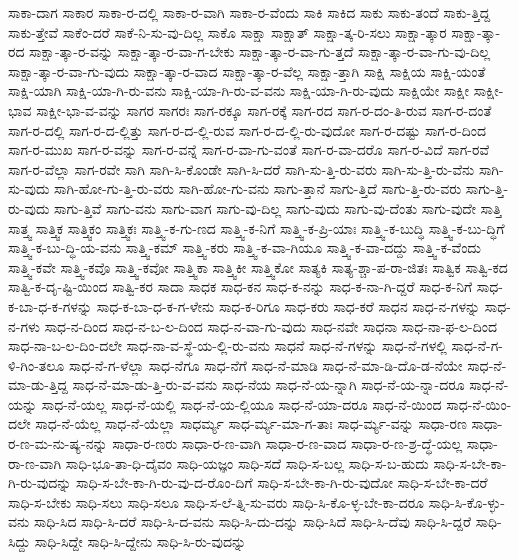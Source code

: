 {ಸಾಕಾ-ದಾಗ
ಸಾಕಾರ
ಸಾಕಾ-ರ-ದಲ್ಲಿ
ಸಾಕಾ-ರ-ವಾಗಿ
ಸಾಕಾ-ರ-ವೆಂದು
ಸಾಕಿ
ಸಾಕಿದ
ಸಾಕು
ಸಾಕು-ತಂದೆ
ಸಾಕು-ತ್ತಿದ್ದ
ಸಾಕು-ತ್ತೇವೆ
ಸಾಕೆಂ-ದರೆ
ಸಾಕೆ-ನಿ-ಸು-ವು-ದಿಲ್ಲ
ಸಾಕೊ
ಸಾಕ್ಷಾ
ಸಾಕ್ಷಾತ್
ಸಾಕ್ಷಾ-ತ್ಕ-ರಿ-ಸಲು
ಸಾಕ್ಷಾ-ತ್ಕಾರ
ಸಾಕ್ಷಾ-ತ್ಕಾ-ರದ
ಸಾಕ್ಷಾ-ತ್ಕಾ-ರ-ವನ್ನು
ಸಾಕ್ಷಾ-ತ್ಕಾ-ರ-ವಾ-ಗ-ಬೇಕು
ಸಾಕ್ಷಾ-ತ್ಕಾ-ರ-ವಾ-ಗು-ತ್ತದೆ
ಸಾಕ್ಷಾ-ತ್ಕಾ-ರ-ವಾ-ಗು-ವು-ದಿಲ್ಲ
ಸಾಕ್ಷಾ-ತ್ಕಾ-ರ-ವಾ-ಗು-ವುದು
ಸಾಕ್ಷಾ-ತ್ಕಾ-ರ-ವಾದ
ಸಾಕ್ಷಾ-ತ್ಕಾ-ರ-ವೆಲ್ಲ
ಸಾಕ್ಷಾ-ತ್ತಾಗಿ
ಸಾಕ್ಷಿ
ಸಾಕ್ಷಿಯ
ಸಾಕ್ಷಿ-ಯಂತೆ
ಸಾಕ್ಷಿ-ಯಾಗಿ
ಸಾಕ್ಷಿ-ಯಾ-ಗಿ-ರು-ವನು
ಸಾಕ್ಷಿ-ಯಾ-ಗಿ-ರು-ವ-ವನು
ಸಾಕ್ಷಿ-ಯಾ-ಗಿ-ರು-ವುದು
ಸಾಕ್ಷಿಯೇ
ಸಾಕ್ಷೀ
ಸಾಕ್ಷೀ-ಭಾವ
ಸಾಕ್ಷೀ-ಭಾ-ವ-ವನ್ನು
ಸಾಗರ
ಸಾಗರಃ
ಸಾಗ-ರಕ್ಕೂ
ಸಾಗ-ರಕ್ಕೆ
ಸಾಗ-ರದ
ಸಾಗ-ರ-ದಂ-ತಿ-ರುವ
ಸಾಗ-ರ-ದಂತೆ
ಸಾಗ-ರ-ದಲ್ಲಿ
ಸಾಗ-ರ-ದ-ಲ್ಲಿತ್ತು
ಸಾಗ-ರ-ದ-ಲ್ಲಿ-ರುವ
ಸಾಗ-ರ-ದ-ಲ್ಲಿ-ರು-ವುದೋ
ಸಾಗ-ರ-ದಷ್ಟು
ಸಾಗ-ರ-ದಿಂದ
ಸಾಗ-ರ-ಮುಖ
ಸಾಗ-ರ-ವನ್ನು
ಸಾಗ-ರ-ವನ್ನೆ
ಸಾಗ-ರ-ವಾ-ಗು-ವಂತೆ
ಸಾಗ-ರ-ವಾ-ದರೊ
ಸಾಗ-ರ-ವಿದೆ
ಸಾಗ-ರವೆ
ಸಾಗ-ರ-ವೆಲ್ಲಾ
ಸಾಗ-ರವೇ
ಸಾಗಿ
ಸಾಗಿ-ಸಿ-ಕೊಂಡೇ
ಸಾಗಿ-ಸಿ-ದರೆ
ಸಾಗಿ-ಸು-ತ್ತಿ-ರು-ವರು
ಸಾಗಿ-ಸು-ತ್ತಿ-ರು-ವೆನು
ಸಾಗಿ-ಸು-ವುದು
ಸಾಗಿ-ಹೋ-ಗು-ತ್ತಿ-ರು-ವರು
ಸಾಗಿ-ಹೋ-ಗು-ವನು
ಸಾಗು-ತ್ತಾನೆ
ಸಾಗು-ತ್ತಿದೆ
ಸಾಗು-ತ್ತಿ-ರು-ವರು
ಸಾಗು-ತ್ತಿ-ರು-ವುದು
ಸಾಗು-ತ್ತಿವೆ
ಸಾಗು-ವನು
ಸಾಗು-ವಾಗ
ಸಾಗು-ವು-ದಿಲ್ಲ
ಸಾಗು-ವುದು
ಸಾಗು-ವು-ದೆಂತು
ಸಾಗು-ವುದೇ
ಸಾತ್ತಿ
ಸಾತ್ತ್ವ
ಸಾತ್ತ್ವಿಕ
ಸಾತ್ತ್ವಿಕಂ
ಸಾತ್ತ್ವಿಕಃ
ಸಾತ್ತ್ವಿ-ಕ-ಗು-ಣದ
ಸಾತ್ತ್ವಿ-ಕ-ನಿಗೆ
ಸಾತ್ತ್ವಿ-ಕ-ಪ್ರಿ-ಯಾಃ
ಸಾತ್ತ್ವಿ-ಕ-ಬುದ್ಧಿ
ಸಾತ್ತ್ವಿ-ಕ-ಬು-ದ್ಧಿಗೆ
ಸಾತ್ತ್ವಿ-ಕ-ಬು-ದ್ಧಿ-ಯ-ವನು
ಸಾತ್ತ್ವಿ-ಕಮ್
ಸಾತ್ತ್ವಿ-ಕರು
ಸಾತ್ತ್ವಿ-ಕ-ವಾ-ಗಿಯೂ
ಸಾತ್ತ್ವಿ-ಕ-ವಾ-ದದ್ದು
ಸಾತ್ತ್ವಿ-ಕ-ವೆಂದು
ಸಾತ್ತ್ವಿ-ಕವೇ
ಸಾತ್ತ್ವಿ-ಕವೊ
ಸಾತ್ತ್ವಿ-ಕವೋ
ಸಾತ್ತ್ವಿಕಾ
ಸಾತ್ತ್ವಿಕೀ
ಸಾತ್ತ್ವಿಕೋ
ಸಾತ್ಯಕಿ
ಸಾತ್ಯ-ಶ್ಚಾ-ಪ-ರಾ-ಜಿತಃ
ಸಾತ್ವಿಕ
ಸಾತ್ವಿ-ಕದ
ಸಾತ್ವಿ-ಕ-ದೃ-ಷ್ಟಿ-ಯಿಂದ
ಸಾತ್ವಿ-ಕರ
ಸಾದಾ
ಸಾಧಕ
ಸಾಧ-ಕನ
ಸಾಧ-ಕ-ನನ್ನು
ಸಾಧ-ಕ-ನಾ-ಗಿ-ದ್ದರೆ
ಸಾಧ-ಕ-ನಿಗೆ
ಸಾಧ-ಕ-ಬಾ-ಧ-ಕ-ಗಳನ್ನು
ಸಾಧ-ಕ-ಬಾ-ಧ-ಕ-ಗ-ಳೇನು
ಸಾಧ-ಕ-ರಿಗೂ
ಸಾಧ-ಕರು
ಸಾಧ-ಕರೆ
ಸಾಧನ
ಸಾಧ-ನ-ಗಳನ್ನು
ಸಾಧ-ನ-ಗಳು
ಸಾಧ-ನ-ದಿಂದ
ಸಾಧ-ನ-ಬ-ಲ-ದಿಂದ
ಸಾಧ-ನ-ವಾ-ಗು-ವುದು
ಸಾಧ-ನವೇ
ಸಾಧನಾ
ಸಾಧ-ನಾ-ಫ-ಲ-ದಿಂದ
ಸಾಧ-ನಾ-ಬ-ಲ-ದಿಂ-ದಲೇ
ಸಾಧ-ನಾ-ವ-ಸ್ಥೆ-ಯ-ಲ್ಲಿ-ರು-ವನು
ಸಾಧನೆ
ಸಾಧ-ನೆ-ಗಳನ್ನು
ಸಾಧ-ನೆ-ಗಳಲ್ಲಿ
ಸಾಧ-ನೆ-ಗ-ಳಿ-ಗಿಂ-ತಲೂ
ಸಾಧ-ನೆ-ಗ-ಳೆಲ್ಲಾ
ಸಾಧ-ನೆಗೂ
ಸಾಧ-ನೆಗೆ
ಸಾಧ-ನೆ-ಮಾಡಿ
ಸಾಧ-ನೆ-ಮಾ-ಡಿ-ದೊ-ಡ-ನೆಯೇ
ಸಾಧ-ನೆ-ಮಾ-ಡು-ತ್ತಿದ್ದ
ಸಾಧ-ನೆ-ಮಾ-ಡು-ತ್ತಿ-ರು-ವ-ವನು
ಸಾಧ-ನೆಯ
ಸಾಧ-ನೆ-ಯ-ನ್ನಾಗಿ
ಸಾಧ-ನೆ-ಯ-ನ್ನಾ-ದರೂ
ಸಾಧ-ನೆ-ಯನ್ನು
ಸಾಧ-ನೆ-ಯಲ್ಲ
ಸಾಧ-ನೆ-ಯಲ್ಲಿ
ಸಾಧ-ನೆ-ಯ-ಲ್ಲಿಯೂ
ಸಾಧ-ನೆ-ಯಾ-ದರೂ
ಸಾಧ-ನೆ-ಯಿಂದ
ಸಾಧ-ನೆ-ಯಿಂ-ದಲೇ
ಸಾಧ-ನೆ-ಯೆಲ್ಲ
ಸಾಧ-ನೆ-ಯೆಲ್ಲಾ
ಸಾಧರ್ಮ್ಯ
ಸಾಧ-ರ್ಮ್ಯ-ಮಾ-ಗ-ತಾಃ
ಸಾಧ-ರ್ಮ್ಯ-ವನ್ನು
ಸಾಧಾ-ರಣ
ಸಾಧಾ-ರ-ಣ-ಮ-ನು-ಷ್ಯ-ನನ್ನು
ಸಾಧಾ-ರ-ಣರು
ಸಾಧಾ-ರ-ಣ-ವಾಗಿ
ಸಾಧಾ-ರ-ಣ-ವಾದ
ಸಾಧಾ-ರ-ಣ-ಶ್ರ-ದ್ಧೆ-ಯಲ್ಲ
ಸಾಧಾ-ರಾ-ಣ-ವಾಗಿ
ಸಾಧಿ-ಭೂ-ತಾ-ಧಿ-ದೈವಂ
ಸಾಧಿ-ಯಜ್ಞಂ
ಸಾಧಿ-ಸದೆ
ಸಾಧಿ-ಸ-ಬಲ್ಲ
ಸಾಧಿ-ಸ-ಬ-ಹುದು
ಸಾಧಿ-ಸ-ಬೇ-ಕಾ-ಗಿ-ರು-ವುದನ್ನು
ಸಾಧಿ-ಸ-ಬೇ-ಕಾ-ಗಿ-ರು-ವು-ದ-ರೊಂ-ದಿಗೆ
ಸಾಧಿ-ಸ-ಬೇ-ಕಾ-ಗಿ-ರು-ವುದೋ
ಸಾಧಿ-ಸ-ಬೇ-ಕಾ-ದರೆ
ಸಾಧಿ-ಸ-ಬೇಕು
ಸಾಧಿ-ಸಲು
ಸಾಧಿ-ಸಲೂ
ಸಾಧಿ-ಸ-ಲೆ-ತ್ನಿ-ಸು-ವರು
ಸಾಧಿ-ಸಿ-ಕೊ-ಳ್ಳ-ಬೇ-ಕಾ-ದರೂ
ಸಾಧಿ-ಸಿ-ಕೊ-ಳ್ಳು-ವನು
ಸಾಧಿ-ಸಿದ
ಸಾಧಿ-ಸಿ-ದರೆ
ಸಾಧಿ-ಸಿ-ದ-ವನು
ಸಾಧಿ-ಸಿ-ದು-ದನ್ನು
ಸಾಧಿ-ಸಿದೆ
ಸಾಧಿ-ಸಿ-ದೆವು
ಸಾಧಿ-ಸಿ-ದ್ದರೆ
ಸಾಧಿ-ಸಿದ್ದು
ಸಾಧಿ-ಸಿದ್ದೇ
ಸಾಧಿ-ಸಿ-ದ್ದೇನು
ಸಾಧಿ-ಸಿ-ರು-ವುದನ್ನು
}
